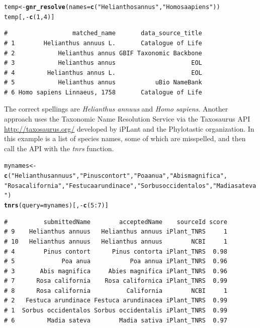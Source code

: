 \documentclass[10pt,a4paper,twocolumn]{article}\usepackage[]{graphicx}\usepackage[]{color}
\makeatletter
\newcommand{\hlnum}[1]{\textcolor[rgb]{0.686,0.059,0.569}{#1}}%
\newcommand{\hlstr}[1]{\textcolor[rgb]{0.192,0.494,0.8}{#1}}%
\newcommand{\hlopt}[1]{\textcolor[rgb]{0,0,0}{#1}}%
\newcommand{\hlstd}[1]{\textcolor[rgb]{0.345,0.345,0.345}{#1}}%
\newcommand{\hlkwb}[1]{\textcolor[rgb]{0.69,0.353,0.396}{#1}}%
\newcommand{\hlkwc}[1]{\textcolor[rgb]{0.333,0.667,0.333}{#1}}%
\newcommand{\hlkwd}[1]{\textcolor[rgb]{0.737,0.353,0.396}{\textbf{#1}}}%
\newenvironment{kframe}{%
 \def\at@end@of@kframe{}%
 \ifinner\ifhmode%
  \def\at@end@of@kframe{\end{minipage}}%
  \begin{minipage}{\columnwidth}%
 \fi\fi%
 \def\FrameCommand##1{\hskip\@totalleftmargin \hskip-\fboxsep
 \colorbox{shadecolor}{##1}\hskip-\fboxsep
     \hskip-\linewidth \hskip-\@totalleftmargin \hskip\columnwidth}%
 \MakeFramed {\advance\hsize-\width
   \@totalleftmargin\z@ \linewidth\hsize
   \@setminipage}}%
 {\par\unskip\endMakeFramed%
 \at@end@of@kframe}
\newenvironment{knitrout}{}{} %
\makeatother
\begin{document}
\begin{knitrout}\scriptsize
{}\color{fgcolor}\begin{kframe}
\begin{alltt}
\hlstd{temp} \hlkwb{<-} \hlkwd{gnr_resolve}\hlstd{(}\hlkwc{names} \hlstd{=} \hlkwd{c}\hlstd{(}\hlstr{"Helianthos annus"}\hlstd{,} \hlstr{"Homo saapiens"}\hlstd{))}
\hlstd{temp[,} \hlopt{-}\hlkwd{c}\hlstd{(}\hlnum{1}\hlstd{,} \hlnum{4}\hlstd{)]}
\end{alltt}
\begin{verbatim}
#                  matched_name       data_source_title
# 1        Helianthus annuus L.       Catalogue of Life
# 2            Helianthus annus GBIF Taxonomic Backbone
# 3            Helianthus annus                     EOL
# 4         Helianthus annus L.                     EOL
# 5            Helianthus annus           uBio NameBank
# 6 Homo sapiens Linnaeus, 1758       Catalogue of Life
\end{verbatim}
\end{kframe}
\end{knitrout}



The correct spellings are \emph{Helianthus annuus} and \emph{Homo sapiens}. Another approach uses the Taxonomic Name Resolution Service via the Taxosaurus API \url{http://taxosaurus.org/} developed by iPLant and the Phylotastic organization. In this example is a list of species names, some of which are misspelled, and then call the API with the \emph{tnrs} function.

\begin{knitrout}\scriptsize
{}\color{fgcolor}\begin{kframe}
\begin{alltt}
\hlstd{mynames} \hlkwb{<-} \hlkwd{c}\hlstd{(}\hlstr{"Helianthus annuus"}\hlstd{,} \hlstr{"Pinus contort"}\hlstd{,} \hlstr{"Poa anua"}\hlstd{,} \hlstr{"Abis magnifica"}\hlstd{,}
    \hlstr{"Rosa california"}\hlstd{,} \hlstr{"Festuca arundinace"}\hlstd{,} \hlstr{"Sorbus occidentalos"}\hlstd{,} \hlstr{"Madia sateva"}\hlstd{)}
\hlkwd{tnrs}\hlstd{(}\hlkwc{query} \hlstd{= mynames)[,} \hlopt{-}\hlkwd{c}\hlstd{(}\hlnum{5}\hlopt{:}\hlnum{7}\hlstd{)]}
\end{alltt}
\begin{verbatim}
#          submittedName        acceptedName    sourceId score
# 9    Helianthus annuus   Helianthus annuus iPlant_TNRS     1
# 10   Helianthus annuus   Helianthus annuus        NCBI     1
# 4        Pinus contort      Pinus contorta iPlant_TNRS  0.98
# 5             Poa anua           Poa annua iPlant_TNRS  0.96
# 3       Abis magnifica     Abies magnifica iPlant_TNRS  0.96
# 7      Rosa california    Rosa californica iPlant_TNRS  0.99
# 8      Rosa california          California        NCBI     1
# 2   Festuca arundinace Festuca arundinacea iPlant_TNRS  0.99
# 1  Sorbus occidentalos Sorbus occidentalis iPlant_TNRS  0.99
# 6         Madia sateva        Madia sativa iPlant_TNRS  0.97
\end{verbatim}
\end{kframe}
\end{knitrout}
\end{document}
